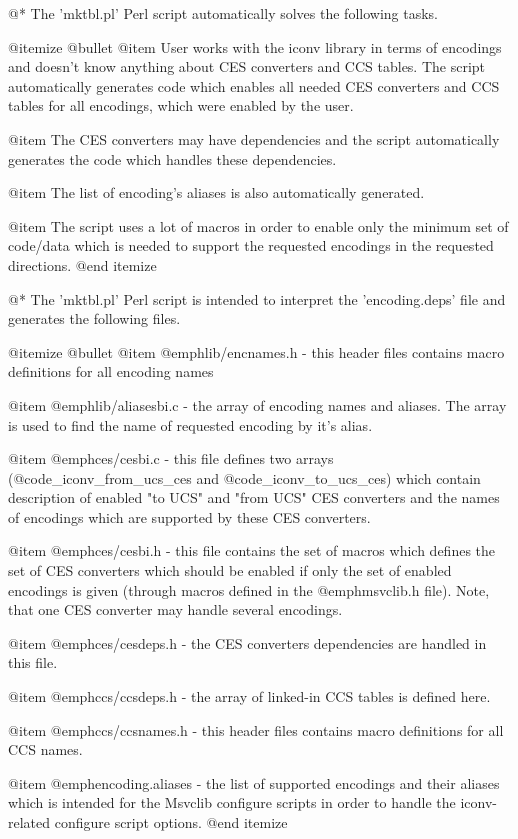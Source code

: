 @*
The 'mktbl.pl' Perl script automatically solves the following tasks.

@itemize @bullet
@item
User works with the iconv library in terms of encodings and doesn't know
anything about CES converters and CCS tables. The script automatically
generates code which enables all needed CES converters and CCS tables
for all encodings, which were enabled by the user.

@item
The CES converters may have dependencies and the script automatically
generates the code which handles these dependencies.

@item
The list of encoding's aliases is also automatically generated.

@item
The script uses a lot of macros in order to enable only the minimum set
of code/data which is needed to support the requested encodings in the
requested directions.
@end itemize

@*
The 'mktbl.pl' Perl script is intended to interpret the 'encoding.deps'
file and generates the following files.

@itemize @bullet
@item
@emph{lib/encnames.h} - this header files contains macro definitions for all
encoding names

@item
@emph{lib/aliasesbi.c} - the array of encoding names and aliases. The array
is used to find the name of requested encoding by it's alias.

@item
@emph{ces/cesbi.c} - this file defines two arrays
(@code{_iconv_from_ucs_ces} and @code{_iconv_to_ucs_ces}) which contain
description of enabled "to UCS" and "from UCS" CES converters and the
names of encodings which are supported by these CES converters.

@item
@emph{ces/cesbi.h} - this file contains the set of macros which defines
the set of CES converters which should be enabled if only the set of
enabled encodings is given (through macros defined in the
@emph{msvclib.h} file). Note, that one CES converter may handle several
encodings.

@item
@emph{ces/cesdeps.h} - the CES converters dependencies are handled in
this file.

@item
@emph{ccs/ccsdeps.h} - the array of linked-in CCS tables is defined
here.

@item
@emph{ccs/ccsnames.h} - this header files contains macro definitions for all
CCS names.

@item
@emph{encoding.aliases} - the list of supported encodings and their
aliases which is intended for the Msvclib configure scripts in order to
handle the iconv-related configure script options.
@end itemize





